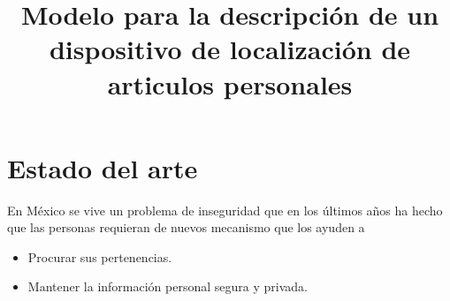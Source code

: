 \documentclass[11pt]{book}
\title{Modelo para la descripción de un dispositivo de localización de articulos personales }
\date{}
\begin{document}
	\maketitle
	\makeProjectCharter
	\tableofcontents
	
	
	\chapter{Estado del arte}
	
	En México se vive un problema de inseguridad que en los últimos años ha hecho que las personas requieran de nuevos mecanismo que los ayuden a 
	
	\begin{itemize}
		\item Procurar sus pertenencias.
		\item Mantener la información personal segura y privada.
	\end{itemize}
	
	
	
\end{document}
